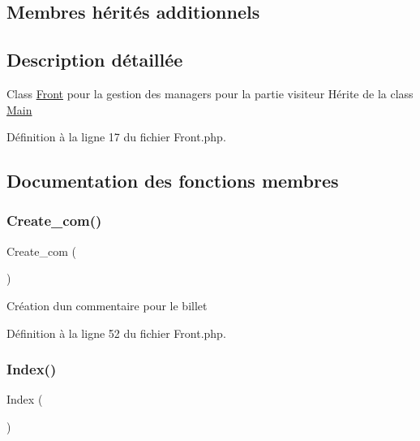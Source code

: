 \subsection*{Membres hérités additionnels}


\subsection{Description détaillée}
Class \hyperlink{class_src_1_1_controllers_1_1_front}{Front} pour la gestion des managers pour la partie visiteur Hérite de la class \hyperlink{class_src_1_1_controllers_1_1_main}{Main} 

Définition à la ligne 17 du fichier Front.\+php.



\subsection{Documentation des fonctions membres}
\mbox{\label{class_src_1_1_controllers_1_1_front_aff5b608669ee776cd4c341238adddb7c}} 
\subsubsection{\texorpdfstring{Create\+\_\+com()}{Create\_com()}}
{\footnotesize\ttfamily Create\+\_\+com (\begin{DoxyParamCaption}{ }\end{DoxyParamCaption})}

Création d\textquotesingle{}un commentaire pour le billet 

Définition à la ligne 52 du fichier Front.\+php.

\mbox{\label{class_src_1_1_controllers_1_1_front_ac36db983080e1b0934908febca5de2d9}} 
\subsubsection{\texorpdfstring{Index()}{Index()}}
{\footnotesize\ttfamily Index (\begin{DoxyParamCaption}{ }\end{DoxyParamCaption})}

